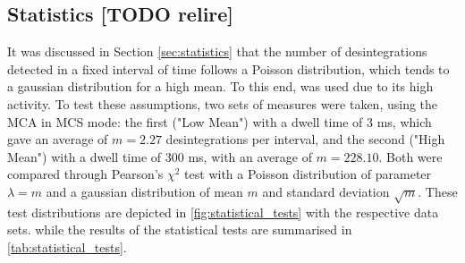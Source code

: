 \subsection{Statistics [TODO relire]}
It was discussed in Section \ref{sec:statistics} that the number of desintegrations detected 
in a fixed interval of time follows a Poisson distribution, which tends to 
a gaussian distribution for a high mean.
To this end, \cesium was used due to its high activity.
To test these assumptions, two sets of measures were taken, using the MCA in MCS mode: 
the first ("Low Mean") with a dwell time of $3$ ms, which gave an average of $m = 2.27$ desintegrations per interval, 
and the second ("High Mean") with a dwell time of $300$ ms, with an average of $m = 228.10$.
Both were compared through Pearson's $\chi^2$ test 
with a Poisson distribution of parameter $\lambda = m$ 
and a gaussian distribution of mean $m$ and standard deviation $\sqrt{m}$.
These test distributions are depicted in \autoref{fig:statistical_tests} with
the respective data sets.
while the results of the statistical tests are summarised in \autoref{tab:statistical_tests}.
%
